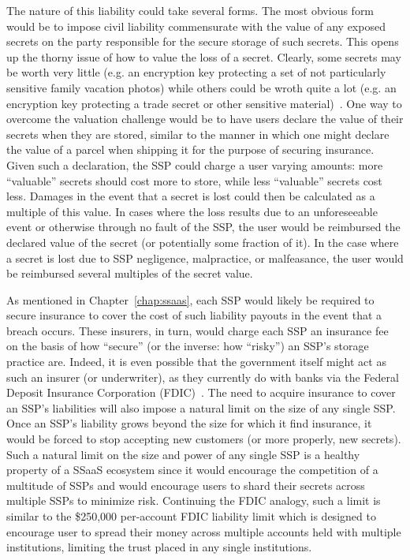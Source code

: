 The nature of this liability could take several forms. The most
obvious form would be to impose civil liability commensurate with the
value of any exposed secrets on the party responsible for the secure
storage of such secrets. This opens up the thorny issue of how to
value the loss of a secret. Clearly, some secrets may be worth very
little (e.g. an encryption key protecting a set of not particularly
sensitive family vacation photos) while others could be wroth quite a
lot (e.g. an encryption key protecting a trade secret or other
sensitive material)~\cite{acquisti2013}. One way to overcome the
valuation challenge would be to have users declare the value of their
secrets when they are stored, similar to the manner in which one might
declare the value of a parcel when shipping it for the purpose of
securing insurance. Given such a declaration, the SSP could charge a
user varying amounts: more ``valuable'' secrets should cost more to
store, while less ``valuable'' secrets cost less. Damages in the event
that a secret is lost could then be calculated as a multiple of this
value. In cases where the loss results due to an unforeseeable event
or otherwise through no fault of the SSP, the user would be reimbursed
the declared value of the secret (or potentially some fraction of
it). In the case where a secret is lost due to SSP negligence,
malpractice, or malfeasance, the user would be reimbursed several
multiples of the secret value.

As mentioned in Chapter~\ref{chap:ssaas}, each SSP would likely be
required to secure insurance to cover the cost of such liability
payouts in the event that a breach occurs. These insurers, in turn,
would charge each SSP an insurance fee on the basis of how ``secure''
(or the inverse: how ``risky'') an SSP's storage practice are. Indeed,
it is even possible that the government itself might act as such an
insurer (or underwriter), as they currently do with banks via the
Federal Deposit Insurance Corporation (FDIC)~\cite{fdic}. The need to
acquire insurance to cover an SSP's liabilities will also impose a
natural limit on the size of any single SSP. Once an SSP's liability
grows beyond the size for which it find insurance, it would be forced
to stop accepting new customers (or more properly, new secrets). Such
a natural limit on the size and power of any single SSP is a healthy
property of a SSaaS ecosystem since it would encourage the competition
of a multitude of SSPs and would encourage users to shard their
secrets across multiple SSPs to minimize risk. Continuing the FDIC
analogy, such a limit is similar to the \$250,000 per-account FDIC
liability limit which is designed to encourage user to spread their
money across multiple accounts held with multiple institutions,
limiting the trust placed in any single institutions.

